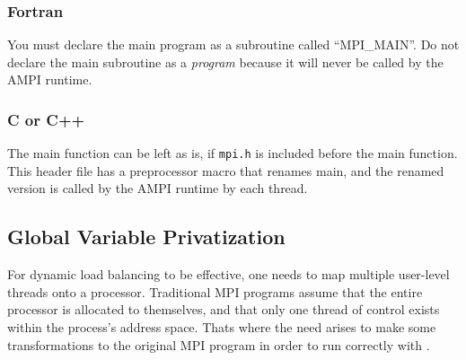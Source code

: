 \documentclass[10pt]{article}
\begin{document}
\subsubsection{Fortran}

You must declare the main program as a subroutine called ``MPI\_MAIN''. Do not declare the main subroutine as a \textit{program} because it will never be called by the AMPI runtime.

\subsubsection{C or C++}

The main function can be left as is, if \texttt{mpi.h} is included before the main function. This header file has a preprocessor macro that renames main, and the renamed version is called by the AMPI runtime by each thread.


\subsection{Global Variable Privatization}

For dynamic load balancing to be effective, one needs to map multiple
user-level threads onto a processor. Traditional MPI programs assume that the
entire processor is allocated to themselves, and that only one thread of
control exists within the process's address space.  Thats where the need arises
to make some transformations to the original MPI program in order to run
correctly with \ampi{}.
\end{document}
